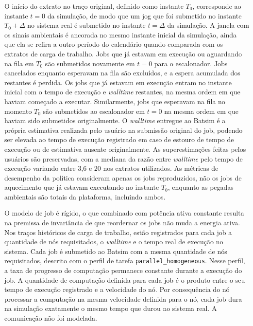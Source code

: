 O início do extrato no traço original, definido como instante $T_{0}$, corresponde ao instante $t = 0$ da simulação, de modo que
um jog que foi submetido no instante $T_{0} + \Delta$ no sistema real é submetido no instante $t = \Delta$ da simulação. A janela
com os sinais ambientais é ancorada no mesmo instante inicial da simulação, ainda que ela se refira a outro período do calendário
quando comparada com os extratos de carga de trabalho. Jobs que já estavam em execução ou aguardando na fila em $T_{0}$ são 
submetidos novamente em $t = 0$ para o escalonador. Jobs cancelados enquanto esperavam na fila são excluídos, e a 
espera acumulada dos restantes é perdida.
Os jobs que já estavam em execução entram no instante inicial com o tempo de execução e \textit{walltime} restantes, na mesma ordem
em que haviam começado a executar. Similarmente, jobs que esperavam na fila no momento $T_{0}$ 
são submetidos ao escalonador em $t = 0$ na mesma ordem em que haviam sido submetidos originalmente. O \textit{walltime} entregue ao Batsim
é a própria estimativa realizada pelo usuário na submissão original do job, podendo ser elevada ao tempo de execução registrado
em caso de estouro de tempo de execução ou de estimativa ausente originalmente. As superestimações feitas pelos usuários são preservadas,
com a mediana da razão entre \textit{walltime} pelo tempo de execução variando entre 3,6 e 20 nos extratos utilizados. As métricas de desempenho
da política consideram apenas os jobs reproduzidos, não os jobs de aquecimento que já estavam executando no instante $T_{0}$, enquanto
as pegadas ambientais são totais da plataforma, incluindo ambos.

O modelo de job é rígido, o que combinado com potência ativa constante resulta na premissa de invariância de que reordernar
os jobs não muda a energia ativa. Nos traços históricos de carga de trabalho, estão registrados para cada job
a quantidade de nós requisitados, o \textit{walltime} e o tempo real de execução no sistema. Cada job é submetido ao Batsim com a mesma 
quantidade de nós requisitados, descrito com o perfil de tarefa \texttt{parallel\_homogeneous}. Nesse perfil, a taxa de progresso 
de computação permanece constante durante a execução do job. A quantidade de computação definida para cada job é o produto entre
o seu tempo de execução registrado e a velocidade do nó. Por consequência do nó processar a computação na mesma velocidade definida para 
o nó, cada job dura na simulação exatamente o mesmo tempo que durou no sistema real. A comunicação não foi modelada. 


